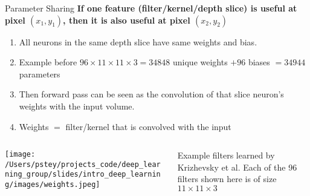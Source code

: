 \documentclass[pdf]{beamer}
\begin{document}
	\begin{frame}{Parameter Sharing}
	\textbf{If one feature (filter/kernel/depth slice) is useful at pixel $(x_1, y_1)$, then it is also useful at pixel $(x_2, y_2)$}
	
	\begin{enumerate}
		\item All neurons in the same depth slice have same weights and bias.
		\item Example before $96 \times 11 \times 11 \times 3 = 34848$ unique weights $ + 96 $ biases $ = 34944$ parameters
		\item Then forward pass can be seen as the convolution of that slice neuron's weights with the input volume.
		\item Weights $=$ filter/kernel that is convolved with the input
	\end{enumerate}
	
	\begin{columns}
	\begin{column}{0.7\textwidth}
	\begin{center}
		\texttt{[image: /Users/pstey/projects\_code/deep\_learning\_group/slides/intro\_deep\_learning/images/weights.jpeg]}
	\end{center}
	\end{column}
	\begin{column}{0.3\textwidth}
		\tiny{Example filters learned by Krizhevsky et al. Each of the 96 filters shown here is of size $11 \times 11 \times 3$}
	\end{column}
	
	\end{columns}
	\end{frame}
\end{document}
